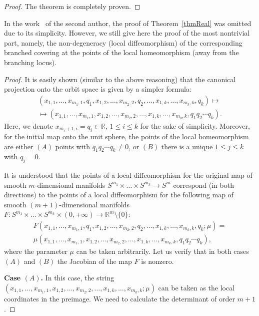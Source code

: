 \documentclass[english, 12pt]{amsproc}
\numberwithin{equation}{section}
\theoremstyle{plain}
\theoremstyle{definition}
\theoremstyle{remark}
\newcommand{\Ro}{\mathbb{R}}
\begin{document}
\begin{proof}
The theorem is completely proven.
\end{proof}

In the work~\cite{Gug19} of the second author, the proof of Theorem~\ref{thmReal} was omitted due to its simplicity. However, we still give here the proof of the most nontrivial part, namely, the non-degeneracy (local diffeomorphism) of the corresponding branched covering at the points of the local homeomorphism (away from the branching locus).

\begin{proof}
It is easily shown (similar to the above reasoning) that the canonical projection onto the orbit space is given by a simpler formula:
\begin{multline*}
(x_{1,1}, \ldots, x_{m_1,1}, q_1, x_{1,2},\ldots, x_{m_2,2}, q_2, \ldots, x_{1,k},\ldots, x_{m_k,k}, q_k) \mapsto \\
  \mapsto (x_{1,1}, \ldots, x_{m_1,1}, x_{1,2},\ldots, x_{m_2,2}, \ldots, x_{1,k},\ldots, x_{m_k,k}, q_1q_2\cdots q_k).
\end{multline*}
Here, we denote $x_{m_i+1,i} = q_i\in \Ro$, $1\leqslant i\leqslant k$ for the sake of simplicity. Moreover, for the initial map onto the unit sphere, the points of the local homeomorphism are either $(A)$ points with $q_1q_2\cdots q_k \neq 0$, or $(B)$ there is a unique $1\leqslant j \leqslant k$ with $q_j=0$.

It is understood that the points of a local diffeomorphism for the original map of smooth $m$-dimensional manifolds $S^{m_1}\times \ldots \times S^{m_k} \to S^m$ correspond (in both directions) to the points of a local diffeomorphism for the following map of smooth $(m+1)$-dimensional manifolds $F\colon S^{m_1}\times \ldots \times S^{m_k}\times (0,+\infty) \to \Ro^m\setminus\{0\}$:
\begin{gather*}
F(x_{1,1}, \ldots, x_{m_1,1}, q_1, x_{1,2},\ldots, x_{m_2,2}, q_2, \ldots, x_{1,k},\ldots, x_{m_k,k}, q_k;\mu) =\\
\mu(x_{1,1}, \ldots, x_{m_1,1}, x_{1,2},\ldots, x_{m_2,2}, \ldots, x_{1,k},\ldots, x_{m_k,k}, q_1q_2\cdots q_k),
\end{gather*}
where the parameter $\mu$ can be taken arbitrarily. Let us verify that in both cases $(A)$ and $(B)$ the Jacobian of the map $F$ is nonzero.

\textbf{Case $(A)$.} In this case, the string $(x_{1,1}, \ldots, x_{m_1,1}, x_{1,2},\ldots, x_{m_2,2}, \ldots, x_{1,k},\ldots, x_{m_k,k};\mu)$ can be taken as the local coordinates in the preimage. We need to calculate the determinant of order $m+1$.


\end{proof}
\end{document}
